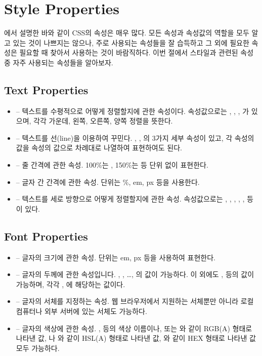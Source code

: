 \section{Style Properties}\label{sect:style-properties}

에서 설명한 바와 같이 CSS의 속성은 매우 많다. 모든 속성과 속성값의 역할을 모두 알고 있는 것이 나쁘지는 않으나, 주로 사용되는 속성들을 잘 습득하고 그 외에 필요한 속성은 필요할 때 찾아서 사용하는 것이 바람직하다. 이번 절에서 스타일과 관련된 속성 중 자주 사용되는 속성들을 알아보자.

\subsection*{Text Properties}

\begin{itemize}
    \item {} – 텍스트를 수평적으로 어떻게 정렬할지에 관한 속성이다. 속성값으로는 , , , 가 있으며, 각각 가운데, 왼쪽, 오른쪽, 양쪽 정렬을 뜻한다.
    \item {} – 텍스트를 선(line)을 이용하여 꾸민다. , , 의 3가지 세부 속성이 있고, 각 속성의 값을  속성의 값으로 차례대로 나열하여 표현하여도 된다.	
    \item {} – 줄 간격에 관한 속성. 100\%는 , 150\%는  등 단위 없이 표현한다.
    \item {} – 글자 간 간격에 관한 속성. 단위는 \%, em, px 등을 사용한다.
    \item {} – 텍스트를 세로 방향으로 어떻게 정렬할지에 관한 속성. 속성값으로는 , , , , ,  등이 있다.
\end{itemize}

\subsection*{Font Properties}

\begin{itemize}
    \item {} – 글자의 크기에 관한 속성. 단위는 em, px 등을 사용하여 표현한다.
    \item {} – 글자의 두께에 관한 속성입니다. , , \ldots, 의 값이 가능하다. 이 외에도 ,  등의 값이 가능하며, 각각 , 에 해당하는 값이다.
    \item {} – 글자의 서체를 지정하는 속성. 웹 브라우저에서 지원하는 서체뿐만 아니라 로컬 컴퓨터나 외부 서버에 있는 서체도 가능하다.
    \item {} – 글자의 색상에 관한 속성. ,  등의 색상 이름이나,  또는 와 같이 RGB(A) 형태로 나타낸 값, 나 와 같이 HSL(A) 형태로 나타낸 값, 와 같이 HEX 형태로 나타낸 값 모두 가능하다.
\end{itemize}

